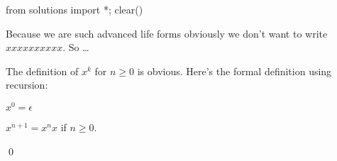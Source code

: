 \begin{python0}
from solutions import *; clear()
\end{python0}

 Because we are such advanced life forms obviously we don't want
 to write $xxxxxxxxxx$. So \ldots

 \begin{defn}  
 The definition of $x^k$ for $n \geq 0$ is obvious.
 Here's the formal definition using recursion:
 \begin{tightlist}
  \item $x^0 = \epsilon$
  \item $x^{n+1} = x^n x$ if $n \geq 0$.
 \end{tightlist}
 \qed
\end{defn}


